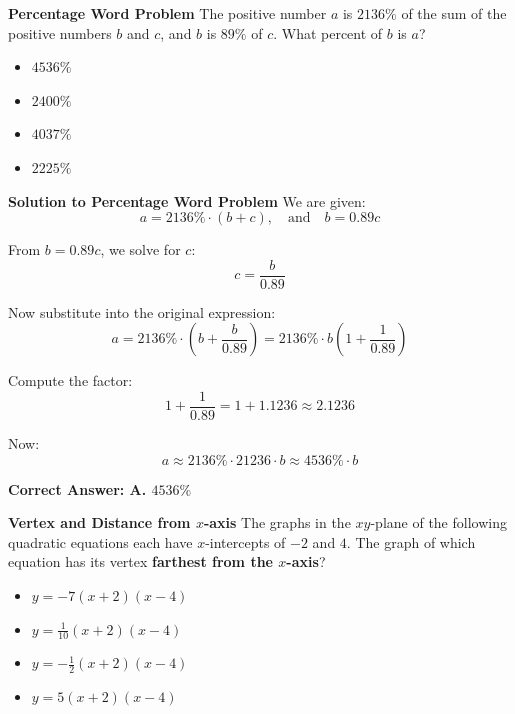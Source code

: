 \documentclass{beamer}
\begin{document}
\begin{frame}{\textbf{Percentage Word Problem}}
The positive number $a$ is $2136\%$ of the sum of the positive numbers $b$ and $c$, and $b$ is $89\%$ of $c$. What percent of $b$ is $a$?

\begin{itemize}
    \item[A.] $4536\%$
    \item[B.] $2400\%$
    \item[C.] $4037\%$
    \item[D.] $2225\%$
\end{itemize}
\end{frame}


\begin{frame}{\textbf{Solution to Percentage Word Problem}}
We are given:
\[
a = 2136\% \cdot (b + c), \quad \text{and} \quad b = 0.89c
\]

From $b = 0.89c$, we solve for $c$:
\[
c = \frac{b}{0.89}
\]

Now substitute into the original expression:
\[
a = 2136\% \cdot \left(b + \frac{b}{0.89}\right) = 2136\% \cdot b \left(1 + \frac{1}{0.89} \right)
\]

Compute the factor:
\[
1 + \frac{1}{0.89} = 1 + 1.1236 \approx 2.1236
\]

Now:
\[
a \approx 2136\% \cdot 21236 \cdot b \approx 4536\% \cdot b
\]

\textbf{Correct Answer: A. $4536\%$}
\end{frame}


\begin{frame}{\textbf{Vertex and Distance from $x$-axis}}
The graphs in the $xy$-plane of the following quadratic equations each have $x$-intercepts of $-2$ and $4$. The graph of which equation has its vertex \textbf{farthest from the $x$-axis}?

\begin{itemize}
    \item[A.] $y = -7(x + 2)(x - 4)$
    \item[B.] $y = \frac{1}{10}(x + 2)(x - 4)$
    \item[C.] $y = -\frac{1}{2}(x + 2)(x - 4)$
    \item[D.] $y = 5(x + 2)(x - 4)$
\end{itemize}
\end{frame}
\end{document}
